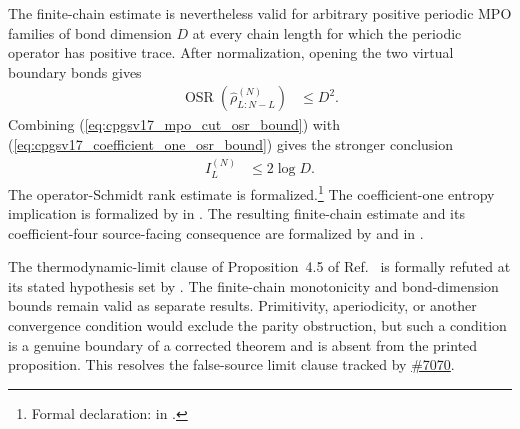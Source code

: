 \documentclass[11pt]{article}
\begin{document}
The finite-chain estimate is nevertheless valid for arbitrary positive
periodic MPO families of bond dimension $D$ at every chain length for which
the periodic operator has positive trace. After normalization, opening the two
virtual boundary bonds gives
\begin{align}
    \operatorname{OSR}
        (\widehat\rho^{(N)}_{L:N-L})
        &\leq D^2.
    \label{eq:cpgsv17_mpo_cut_osr_bound}
\end{align}
Combining (\ref{eq:cpgsv17_mpo_cut_osr_bound}) with
(\ref{eq:cpgsv17_coefficient_one_osr_bound}) gives the stronger conclusion
\begin{align}
    I_L^{(N)}
        &\leq 2\log D.
    \label{eq:cpgsv17_finite_chain_two_log_bound}
\end{align}
The operator-Schmidt rank estimate is formalized.\footnote{Formal declaration:
 in
.}
The coefficient-one entropy implication is formalized by
 in
. The resulting
finite-chain estimate and its coefficient-four source-facing consequence are
formalized by
 and
 in
.

The thermodynamic-limit clause of Proposition~4.5 of
Ref.~\cite{Cirac2016MPDO_arXiv} is formally refuted at its stated hypothesis
set by
.
The finite-chain monotonicity and bond-dimension bounds remain valid as
separate results. Primitivity, aperiodicity, or another convergence condition
would exclude the parity obstruction, but such a condition is a genuine
boundary of a corrected theorem and is absent from the printed proposition.
This resolves the false-source limit clause tracked by
\href{https://github.com/LionSR/TNLean/issues/7070}{\#7070}.



\end{document}
